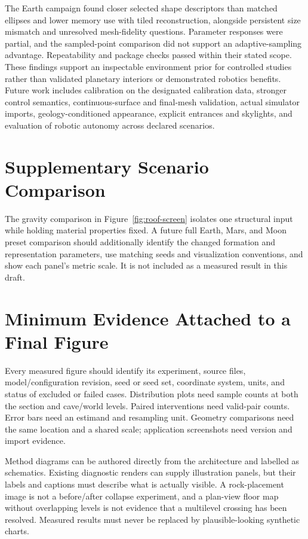\documentclass[conference]{IEEEtran}
\begin{document}
The Earth campaign found closer selected shape descriptors than matched ellipses and lower memory use with tiled reconstruction, alongside persistent size mismatch and unresolved mesh-fidelity questions. Parameter responses were partial, and the sampled-point comparison did not support an adaptive-sampling advantage. Repeatability and package checks passed within their stated scope. These findings support an inspectable environment prior for controlled studies rather than validated planetary interiors or demonstrated robotics benefits. Future work includes calibration on the designated calibration data, stronger control semantics, continuous-surface and final-mesh validation, actual simulator imports, geology-conditioned appearance, explicit entrances and skylights, and evaluation of robotic autonomy across declared scenarios.

\FloatBarrier
\appendices
\section{Supplementary Scenario Comparison}
\label{app:bodies}
The gravity comparison in Figure~\ref{fig:roof-screen} isolates one structural input while holding material properties fixed. A future full Earth, Mars, and Moon preset comparison should additionally identify the changed formation and representation parameters, use matching seeds and visualization conventions, and show each panel's metric scale. It is not included as a measured result in this draft.



\section{Minimum Evidence Attached to a Final Figure}
Every measured figure should identify its experiment, source files, model/configuration revision, seed or seed set, coordinate system, units, and status of excluded or failed cases. Distribution plots need sample counts at both the section and cave/world levels. Paired interventions need valid-pair counts. Error bars need an estimand and resampling unit. Geometry comparisons need the same location and a shared scale; application screenshots need version and import evidence.

Method diagrams can be authored directly from the architecture and labelled as schematics. Existing diagnostic renders can supply illustration panels, but their labels and captions must describe what is actually visible. A rock-placement image is not a before/after collapse experiment, and a plan-view floor map without overlapping levels is not evidence that a multilevel crossing has been resolved. Measured results must never be replaced by plausible-looking synthetic charts.


\end{document}
